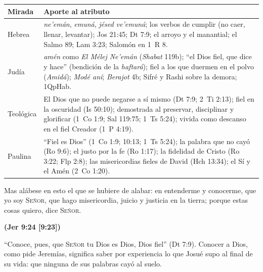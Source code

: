 \documentclass[11pt,letterpaper]{article}
\newcommand{\SENOR}{\textsc{Señor}}
\newcommand{\fuente}[1]{\par\hfill{\upshape\bfseries\small\textcolor{azul}{#1}}}
\begin{document}
\begin{center}\small\renewcommand{\arraystretch}{1.3}
\begin{tabular}{@{}L{3.0cm}L{11.4cm}@{}}
\toprule
\textbf{Mirada} & \textbf{Aporte al atributo} \\ \midrule
Hebrea & \emph{ne'emán}, \emph{emuná}, \emph{jésed ve'emuná}; los verbos de cumplir (no caer, llenar, levantar); Jos 21:45; Dt 7:9; el arroyo y el manantial; el Salmo 89; Lam 3:23; Salomón en 1~R 8. \\
Judía & \emph{amén} como \emph{El Mélej Ne'emán} (\emph{Shabat} 119b); ``el Dios fiel, que dice y hace'' (bendición de la \emph{haftará}); fiel a los que duermen en el polvo (\emph{Amidá}); \emph{Modé aní}; \emph{Berajot} 4b; Sifré y Rashi sobre la demora; 1QpHab. \\
Teológica & El Dios que no puede negarse a sí mismo (Dt 7:9; 2~Ti 2:13); fiel en la oscuridad (Is 50:10); demostrada al preservar, disciplinar y glorificar (1~Co 1:9; Sal 119:75; 1~Ts 5:24); vivida como descanso en el fiel Creador (1~P 4:19). \\
Paulina & ``Fiel es Dios'' (1~Co 1:9; 10:13; 1~Ts 5:24); la palabra que no cayó (Ro 9:6); el justo por la fe (Ro 1:17); la fidelidad de Cristo (Ro 3:22; Flp 2:8); las misericordias fieles de David (Hch 13:34); el Sí y el Amén (2~Co 1:20). \\
\bottomrule
\end{tabular}\end{center}

\begin{cita}Mas alábese en esto el que se hubiere de alabar: en entenderme y conocerme, que yo soy \SENOR{}, que hago misericordia, juicio y justicia en la tierra; porque estas cosas quiero, dice \SENOR{}.\fuente{(Jer 9:24 [9:23])}\end{cita}

``Conoce, pues, que \SENOR{} tu Dios es Dios, Dios fiel'' (Dt 7:9). Conocer a Dios, como pide Jeremías, significa saber por experiencia lo que Josué supo al final de su vida: que ninguna de sus palabras cayó al suelo.

\end{document}
